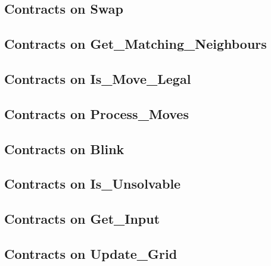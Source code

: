 \subsection{Contracts on Swap}


\subsection{Contracts on Get\_Matching\_Neighbours}


\subsection{Contracts on Is\_Move\_Legal}


\newpage

\subsection{Contracts on Process\_Moves}


\subsection{Contracts on Blink}


\subsection{Contracts on Is\_Unsolvable}


\subsection{Contracts on Get\_Input}


\newpage

\subsection{Contracts on Update\_Grid}


